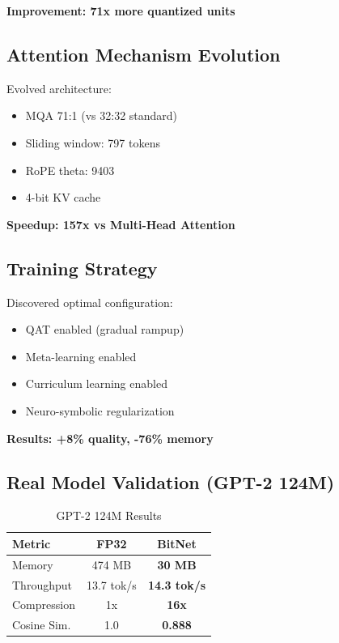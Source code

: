 \documentclass[10pt,conference]{IEEEtran}
\begin{document}
\textbf{Improvement: 71x more quantized units}

\subsection{Attention Mechanism Evolution}

Evolved architecture:
\begin{itemize}
    \item MQA 71:1 (vs 32:32 standard)
    \item Sliding window: 797 tokens
    \item RoPE theta: 9403
    \item 4-bit KV cache
\end{itemize}

\textbf{Speedup: 157x vs Multi-Head Attention}

\subsection{Training Strategy}

Discovered optimal configuration:
\begin{itemize}
    \item QAT enabled (gradual rampup)
    \item Meta-learning enabled
    \item Curriculum learning enabled
    \item Neuro-symbolic regularization
\end{itemize}

\textbf{Results: +8\% quality, -76\% memory}

\subsection{Real Model Validation (GPT-2 124M)}

\begin{table}[htbp]
\caption{GPT-2 124M Results}
\begin{center}
\begin{tabular}{lcc}
\toprule
\textbf{Metric} & \textbf{FP32} & \textbf{BitNet} \\
\midrule
Memory & 474 MB & \textbf{30 MB} \\
Throughput & 13.7 tok/s & \textbf{14.3 tok/s} \\
Compression & 1x & \textbf{16x} \\
Cosine Sim. & 1.0 & \textbf{0.888} \\
\bottomrule
\end{tabular}
\end{center}
\end{table}
\end{document}
